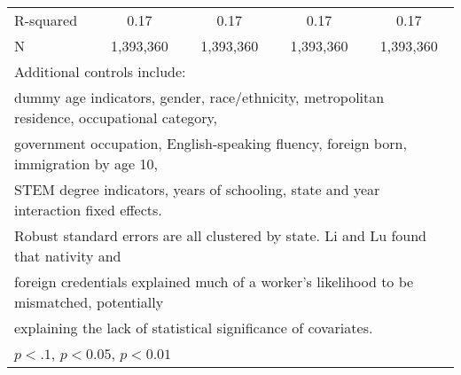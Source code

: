 \begin{table}[htbp]
\begin{tabular}{l*{4}{c}}
R-squared           &        0.17         &        0.17         &        0.17         &        0.17         \\
N                   &   1,393,360         &   1,393,360         &   1,393,360         &   1,393,360         \\
\bottomrule
\multicolumn{5}{l}{\footnotesize Additional controls include:}\\
\multicolumn{5}{l}{\footnotesize dummy age indicators, gender, race/ethnicity, metropolitan residence, occupational category,}\\
\multicolumn{5}{l}{\footnotesize government occupation, English-speaking fluency, foreign born, immigration by age 10,}\\
\multicolumn{5}{l}{\footnotesize STEM degree indicators, years of schooling, state and year interaction fixed effects.}\\
\multicolumn{5}{l}{\footnotesize Robust standard errors are all clustered by state. Li and Lu found that nativity and}\\
\multicolumn{5}{l}{\footnotesize foreign credentials explained much of a worker's likelihood to be mismatched, potentially}\\
\multicolumn{5}{l}{\footnotesize explaining the lack of statistical significance of covariates.}\\
\multicolumn{5}{l}{\footnotesize \sym{*} \(p<.1\), \sym{**} \(p<0.05\), \sym{***} \(p<0.01\)}\\
\end{tabular}
\end{table}
